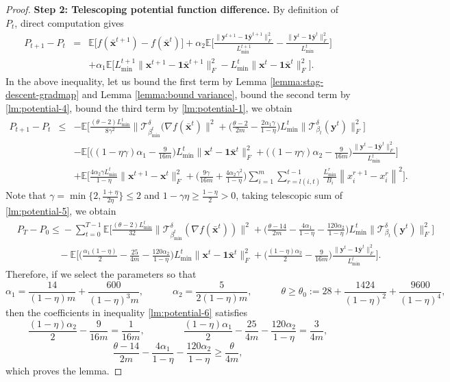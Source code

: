 \documentclass{article}
\newcommand{\cT}{\mathcal{T}}
\newcommand{\ctdb}{\mathcal{T}^\delta_{\beta_t}}
\newcommand{\bxt}{\mathbf{x}^t}
\newcommand{\bxte}{\mathbf{x}^{t+1}}
\newcommand{\byt}{\mathbf{y}^t}
\newcommand{\byte}{\mathbf{y}^{t+1}}
\newcommand{\bbxt}{\bar{\mathbf{x}}^t}
\newcommand{\bbxte}{\bar{\mathbf{x}}^{t+1}}
\newcommand{\bbyt}{\bar{\mathbf{y}}^t}
\newcommand{\bbyte}{\bar{\mathbf{y}}^{t+1}}
\newcommand{\EE}{\mathbb{E}}
\newcommand{\bone}{\mathbf{1}}
\begin{document}
\begin{proof}
\noindent \textbf{Step 2: Telescoping potential function difference.} By definition of $P_t$,  direct computation gives
\begin{eqnarray}
P_{t+1}-P_t & = & \EE\Big[f(\bbxte)-f(\bbxt)\Big] +   \alpha_2\EE\bigg[\frac{\|\byte-\bone\bbyte\|_F^2}{L_{\min}^{t+1}}- \frac{\|\byt-\bone\bbyt\|_F^2}{L_{\min}^{t}}\bigg] \nonumber\\
& & + \alpha_1\EE\Big[L_{\min}^{t+1}\|\bxte-\bone\bbxte\|_F^2- L_{\min}^{t}\|\bxt-\bone\bbxt\|_F^2\Big] \nonumber.
\end{eqnarray}
In the above inequality, let us bound the first term by Lemma \ref{lemma:stag-descent-gradmap} and Lemma \ref{lemma:bound variance}, bound the second term by \eqref{lm:potential-4}, bound the third term by \eqref{lm:potential-1}, 
we obtain 
\begin{eqnarray}
\label{lm:potential-5}
P_{t+1}-P_t & \leq & - \EE\bigg[\frac{(\theta-2)L_{\min}^t}{8\gamma^2}\big\|\cT_{\beta_{\min}^t}^\delta(\nabla f(\bbxt)\big\|^2 + \Big(\frac{\theta-2}{2m}-\frac{2\alpha_1\gamma}{1-\eta}\Big)L_{\min}^t\big\|\ctdb(\byt)\big\|_F^2\bigg] \\
& & -\EE\bigg[\Big((1-\eta\gamma)\alpha_1-\frac{9}{16m}\Big)L_{\min}^t\|\bxt-\bone\bbxt\|_F^2 + \Big((1-\eta\gamma)\alpha_2-\frac{9}{16m}\Big)\frac{\|\byt-\bone\bbyt\|_F^2}{L_{\min}^t}\bigg]\nonumber\\
& & + \EE\bigg[\frac{4\alpha_2\gamma L_{\min}^t}{1-\eta}\|\bxte-\bxt\|_F^2 + \Big(\frac{9\gamma}{16m}+\frac{4\alpha_2\gamma^2}{1-\eta}\Big)\sum_{i=1}^m \!\sum_{r=l(i,t)}^{t-1}\!\!\frac{L_{\min}^{r}}{B_i}\!\left\|x_i^{r+1}-x_i^{r}\right\|^2\bigg] \nonumber.
\end{eqnarray} 
Note that $\gamma = \min\big\{2,\frac{1+\eta}{2\eta}\big\}\leq 2$ and $1-\gamma\eta\geq \frac{1-\eta}{2}>0$, taking telescopic sum of \eqref{lm:potential-5}, we obtain  
\begin{align}
\label{lm:potential-6}
& P_{T}\!-\!P_0  \!\leq\!  -\! \sum_{t=0}^{T-1}\EE\bigg[\frac{(\theta\!-\!2)L_{\min}^t}{32}\big\|\cT_{\beta_{\min}^t}^\delta(\nabla f(\bbxt))\big\|^2 \!+\! \Big(\frac{\theta\!-\!14}{2m}\!-\!\frac{4\alpha_1}{1-\eta}\!-\!\frac{120\alpha_2}{1-\eta}\Big)L_{\min}^t\big\|\ctdb(\byt)\big\|_F^2\bigg] \\
& \qquad\qquad\,\, -\EE\bigg[\Big(\frac{\alpha_1(1-\eta)}{2} - \frac{25}{4m} - \frac{120\alpha_2}{1-\eta}\Big)L_{\min}^t\|\bxt-\bone\bbxt\|_F^2 + \Big(\frac{(1-\eta)\alpha_2}{2}-\frac{9}{16m}\Big)\frac{\|\byt-\bone\bbyt\|_F^2}{L_{\min}^t}\bigg].\nonumber
\end{align} 
Therefore, if we select the parameters so that 
$$\alpha_1 = \frac{14}{(1-\eta)m} + \frac{600}{(1-\eta)^3m},\quad\qquad\alpha_2 = \frac{5}{2(1-\eta)m},\quad\qquad\theta \geq \theta_0:= 28+\frac{1424}{(1-\eta)^2}+\frac{9600}{(1-\eta)^4},$$
then the coefficients in inequality \eqref{lm:potential-6} satisfies
$$\frac{(1-\eta)\alpha_2}{2}-\frac{9}{16m} = \frac{1}{16m}, \qquad \qquad  \frac{(1-\eta)\alpha_1}{2} - \frac{25}{4m} - \frac{120\alpha_2}{1-\eta} = \frac{3}{4m},$$
$$\frac{\theta-14}{2m}-\frac{4\alpha_1}{1-\eta}-\frac{120\alpha_2}{1-\eta} \geq \frac{\theta}{4m},$$
which proves the lemma. 
\end{proof}



\end{document}
